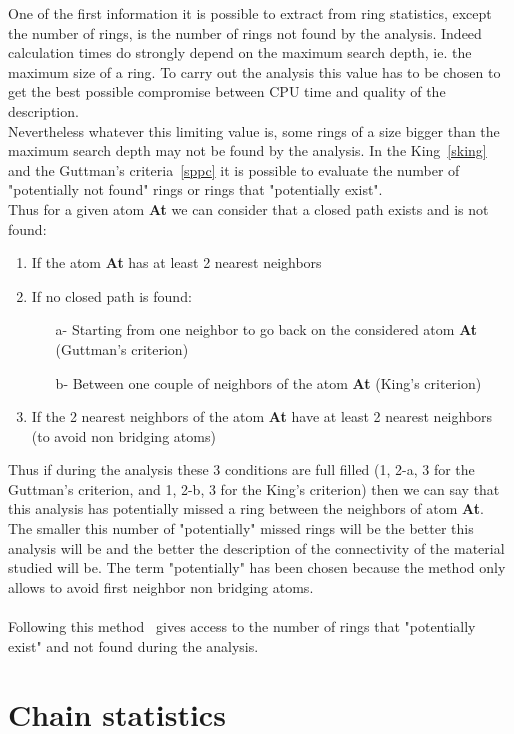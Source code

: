 One of the first information it is possible to extract from ring statistics, except the number of rings, is the number of rings not found by the analysis. 
Indeed calculation times do strongly depend on the maximum search depth, ie. the maximum size of a ring. 
To carry out the analysis this value has to be chosen to get the best possible compromise between CPU time and quality of the description. \\
Nevertheless whatever this limiting value is, some rings of a size bigger than the maximum search depth may not be found by the analysis. 
In the King~\ref{sking} and the Guttman's criteria~\ref{sppc} it is possible to evaluate the number of "potentially not found" rings or rings that "potentially exist". \\
Thus for a given atom {\bf{At}} we can consider that a closed path exists and is not found: 
\begin{enumerate}
\item If the atom {\bf{At}} has at least 2 nearest neighbors
\item If no closed path is found:
\begin{enumerate}
\item[a-] Starting from one neighbor to go back on the considered atom {\bf{At}} (Guttman's criterion)
\item[b-] Between one couple of neighbors of the atom {\bf{At}} (King's criterion)
\end{enumerate}
\item If the 2 nearest neighbors of the atom {\bf{At}} have at least 2 nearest neighbors (to avoid non bridging atoms)  
\end{enumerate}
Thus if during the analysis these 3 conditions are full filled (1, 2-a, 3 for the Guttman's criterion, and 1, 2-b, 3 for the King's criterion) then we can say that this analysis has potentially missed a ring between the neighbors of atom {\bf{At}}. 
The smaller this number of "potentially" missed rings will be the better this analysis will be and the better the description of the connectivity of the material studied will be. 
The term "potentially" has been chosen because the method only allows to avoid first neighbor non bridging atoms. \\
\\
Following this method \atomes\ gives access to the number of rings that "potentially exist" and not found during the analysis.
\clearpage
\section{Chain statistics}
\label{cstat}

